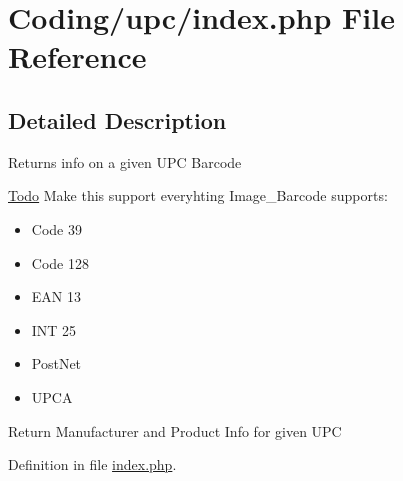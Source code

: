 \hypertarget{index_8php}{
\section{Coding/upc/index.php File Reference}
\label{index_8php}
}


\subsection{Detailed Description}
Returns info on a given UPC Barcode \begin{Desc}
\item[\hyperlink{todo__todo000001}{Todo}]Make this support everyhting Image\_\-Barcode supports:\begin{itemize}
\item Code 39\item Code 128\item EAN 13\item INT 25\item PostNet\item UPCA \end{itemize}


Return Manufacturer and Product Info for given UPC \end{Desc}


Definition in file \hyperlink{index_8php-source}{index.php}.